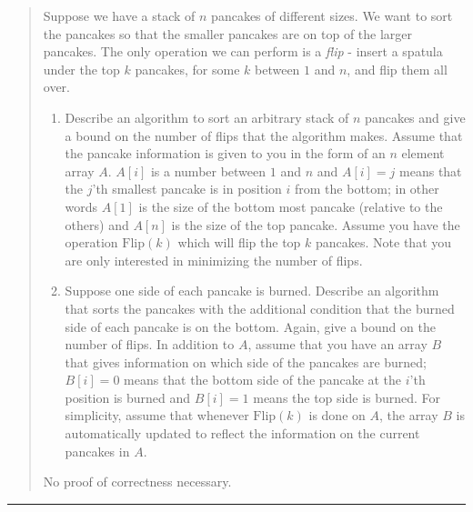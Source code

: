\documentclass[11pt]{article}
\begin{document}



\begin{quote}
	Suppose we have a stack of $n$ pancakes of different sizes. We
       want to sort the pancakes so that the smaller pancakes are on
       top of the larger pancakes. The only operation we can perform
       is a {\em flip} - insert a spatula under the top $k$ pancakes,
       for some $k$ between $1$ and $n$, and flip them all over.

       \begin{enumerate}
           \item 
           Describe an algorithm to sort an arbitrary stack of $n$
           pancakes and give a bound on the number of flips that the
           algorithm makes.  Assume that the pancake information is
           given to you in the form of an $n$ element array
           $A$. $A[i]$ is a number between $1$ and $n$ and $A[i] = j$
           means that the $j$'th smallest pancake is in position $i$
           from the bottom; in other words $A[1]$ is the size of the
           bottom most pancake (relative to the others) and $A[n]$ is
           the size of the top pancake. Assume you have the operation
           $\text{Flip}(k)$ which will flip the top $k$ pancakes. Note
           that you are only interested in minimizing the number of
           flips.

           \item Suppose one side of each pancake is
           burned. Describe an algorithm that sorts the pancakes with
           the additional condition that the burned side of each
           pancake is on the bottom. Again, give a bound on the number
           of flips. In addition to $A$, assume that you have an array
           $B$ that gives information on which side of the pancakes
           are burned; $B[i]=0$ means that the bottom side of the
           pancake at the $i$'th position is burned and $B[i]=1$ means
           the top side is burned. For simplicity, assume that
           whenever $\text{Flip}(k)$ is done on $A$, the array $B$ is
           automatically updated to reflect the information on the
           current pancakes in $A$.
         \end{enumerate}
         \medskip
       No proof of correctness necessary.
\end{quote}
\hrule
\end{document}
